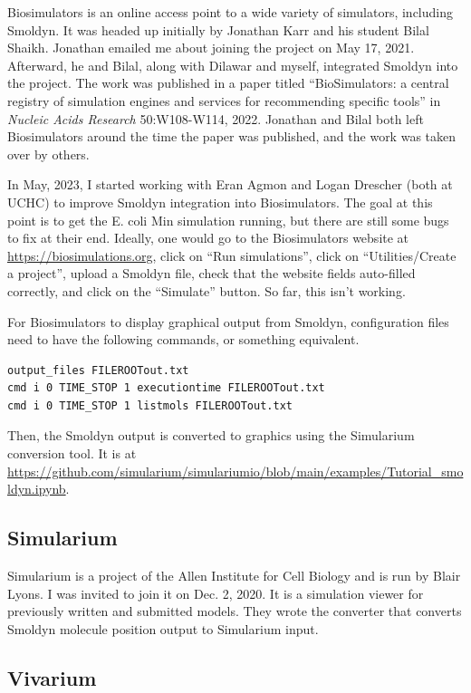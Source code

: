 \documentclass {scrbook}
\begin{document}
Biosimulators is an online access point to a wide variety of simulators, including Smoldyn. It was headed up initially by Jonathan Karr and his student Bilal Shaikh. Jonathan emailed me about joining the project on May 17, 2021. Afterward, he and Bilal, along with Dilawar and myself, integrated Smoldyn into the project. The work was published in a paper titled ``BioSimulators: a central registry of simulation engines and services for recommending specific tools'' in \textit{Nucleic Acids Research} 50:W108-W114, 2022. Jonathan and Bilal both left Biosimulators around the time the paper was published, and the work was taken over by others.

In May, 2023, I started working with Eran Agmon and Logan Drescher (both at UCHC) to improve Smoldyn integration into Biosimulators. The goal at this point is to get the E. coli Min simulation running, but there are still some bugs to fix at their end. Ideally, one would go to the Biosimulators website at \url{https://biosimulations.org}, click on ``Run simulations'', click on ``Utilities/Create a project'', upload a Smoldyn file, check that the website fields auto-filled correctly, and click on the ``Simulate'' button. So far, this isn't working.

For Biosimulators to display graphical output from Smoldyn, configuration files need to have the following commands, or something equivalent.
\begin{lstlisting}
output_files FILEROOTout.txt
cmd i 0 TIME_STOP 1 executiontime FILEROOTout.txt
cmd i 0 TIME_STOP 1 listmols FILEROOTout.txt
\end{lstlisting}
Then, the Smoldyn output is converted to graphics using the Simularium conversion tool. It is at \url{https://github.com/simularium/simulariumio/blob/main/examples/Tutorial_smoldyn.ipynb}.

\subsection{Simularium}

Simularium is a project of the Allen Institute for Cell Biology and is run by Blair Lyons. I was invited to join it on Dec. 2, 2020. It is a simulation viewer for previously written and submitted models. They wrote the converter that converts Smoldyn molecule position output to Simularium input.

\subsection{Vivarium}
\end{document}
